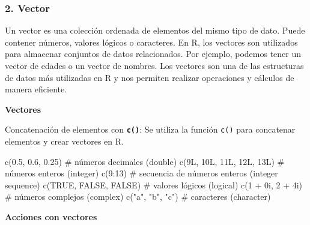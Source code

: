 \documentclass[
  jou,
  floatsintext,
  longtable,
  a4paper,
  nolmodern,
  notxfonts,
  notimes,
  colorlinks=true,linkcolor=blue,citecolor=blue,urlcolor=blue]{apa7}
\newenvironment{Shaded}{\begin{snugshade}}{\end{snugshade}}
\newcommand{\CommentTok}[1]{\textcolor[rgb]{0.37,0.37,0.37}{#1}}
\newcommand{\ConstantTok}[1]{\textcolor[rgb]{0.56,0.35,0.01}{#1}}
\newcommand{\DecValTok}[1]{\textcolor[rgb]{0.68,0.00,0.00}{#1}}
\newcommand{\FloatTok}[1]{\textcolor[rgb]{0.68,0.00,0.00}{#1}}
\newcommand{\FunctionTok}[1]{\textcolor[rgb]{0.28,0.35,0.67}{#1}}
\newcommand{\NormalTok}[1]{\textcolor[rgb]{0.00,0.23,0.31}{#1}}
\newcommand{\SpecialCharTok}[1]{\textcolor[rgb]{0.37,0.37,0.37}{#1}}
\newcommand{\StringTok}[1]{\textcolor[rgb]{0.13,0.47,0.30}{#1}}
\begin{document}
\subsubsection{2. Vector}\label{vector}

Un vector es una colección ordenada de elementos del mismo tipo de dato.
Puede contener números, valores lógicos o caracteres. En R, los vectores
son utilizados para almacenar conjuntos de datos relacionados. Por
ejemplo, podemos tener un vector de edades o un vector de nombres. Los
vectores son una de las estructuras de datos más utilizadas en R y nos
permiten realizar operaciones y cálculos de manera eficiente.

\textbf{Vectores}

Concatenación de elementos con \textbf{\texttt{c()}}: Se utiliza la
función \texttt{c()} para concatenar elementos y crear vectores en R.

\begin{Shaded}
\begin{Highlighting}[]
\FunctionTok{c}\NormalTok{(}\FloatTok{0.5}\NormalTok{, }\FloatTok{0.6}\NormalTok{, }\FloatTok{0.25}\NormalTok{) }\CommentTok{\# números decimales (double)}
\FunctionTok{c}\NormalTok{(}\DecValTok{9}\NormalTok{L, }\DecValTok{10}\NormalTok{L, }\DecValTok{11}\NormalTok{L, }\DecValTok{12}\NormalTok{L, }\DecValTok{13}\NormalTok{L) }\CommentTok{\# números enteros (integer)}
\FunctionTok{c}\NormalTok{(}\DecValTok{9}\SpecialCharTok{:}\DecValTok{13}\NormalTok{) }\CommentTok{\# secuencia de números enteros (integer sequence)}
\FunctionTok{c}\NormalTok{(}\ConstantTok{TRUE}\NormalTok{, }\ConstantTok{FALSE}\NormalTok{, }\ConstantTok{FALSE}\NormalTok{) }\CommentTok{\# valores lógicos (logical)}
\FunctionTok{c}\NormalTok{(}\DecValTok{1} \SpecialCharTok{+} \DecValTok{0}\NormalTok{i, }\DecValTok{2} \SpecialCharTok{+} \DecValTok{4}\NormalTok{i) }\CommentTok{\# números complejos (complex)}
\FunctionTok{c}\NormalTok{(}\StringTok{"a"}\NormalTok{, }\StringTok{"b"}\NormalTok{, }\StringTok{"c"}\NormalTok{) }\CommentTok{\# caracteres (character)}
\end{Highlighting}
\end{Shaded}

\textbf{Acciones con vectores}
\end{document}
